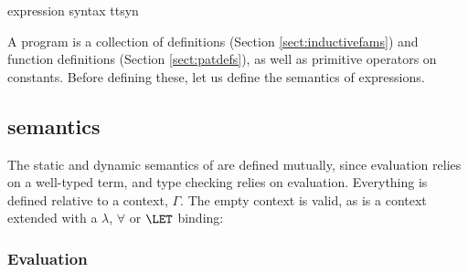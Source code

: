 {\TT{} expression syntax}
{ttsyn}

A \TT{} program is a collection of  definitions (Section 
\ref{sect:inductivefams}) and  function definitions (Section
\ref{sect:patdefs}), as well as primitive operators on constants. 
Before defining these, let us define the semantics of \TT{}
expressions.

\subsection{\TT{} semantics}

The static and dynamic semantics of \TT{} are defined mutually, since
evaluation relies on a well-typed term, and type checking relies on 
evaluation. Everything is defined relative
to a context, $\Gamma$. The empty context
is valid, as is a context extended with a $\lambda$, $\forall$ or
$\LET$ binding:


\subsubsection{Evaluation}

